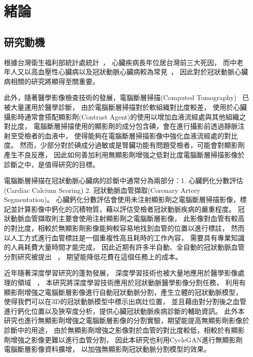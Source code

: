 \documentclass[class=NCU_thesis, crop=false]{standalone}
\begin{document}
\chapter{緒論}
\section{研究動機}
根據台灣衛生福利部統計處統計~\cite{weishengfulibutongjichuSiYinTongJi2017}，
心臟疾病長年位居台灣前三大死因，
而中老年人又以高血壓性心臟病以及冠狀動脈心臟病較為常見~\cite{weishengfulibuguominjiankangshuRenShiGuanXinBing2016}，
因此對於冠狀動脈心臟病相關的研究將顯得至關重要。

此外，隨著醫學影像檢查技術的發展，電腦斷層掃描(Computed Tomography)~\cite{nadrljanskiComputedTomographyRadiology,mckavanaghEssentialsCardiacComputerized2015}
已被大量運用於醫學診斷，
由於電腦斷層掃描對於軟組織對比度較差，
使用於心臟攝影時通常會搭配顯影劑(Contrast Agent)的使用以增加血液流經處與其他組織之對比度，
電腦斷層掃描使用的顯影劑的成分包含碘，會在進行攝影前透過靜脈注射至受檢者的血液中，
使得能夠在電腦斷層掃描影像中強化血液流經處的對比度。
然而，少部分對於碘成分過敏或是腎臟功能有問題受檢者，可能會對顯影劑產生不良反應，
因此如何善加利用無顯影劑增強之低對比度電腦斷層掃描影像於診斷之中，是值得研究的目標。

電腦斷層掃描在冠狀動脈心臟病的診斷中通常分為兩部分：1. 心臟鈣化分數評估(Cardiac Calcium Scoring) 2. 冠狀動脈血管擷取(Coronary Artery Segmentation)。
心臟鈣化分數評估會使用未注射顯影劑之電腦斷層掃描影像，標記並計算影像中鈣化的沉積物質，藉以評估受檢者冠狀動脈疾病的嚴重程度。
冠狀動脈血管擷取則主要會使用注射顯影劑之電腦斷層影像，
此影像對血管有較高的對比度，相較於無顯影劑影像能夠較容易地找到血管的位置以進行標註，
然而以人工方式進行血管標註是一個重複性高且耗時的工作內容，
需要具有專業知識的人員耗費大量時間才能完成，
因此近期有許多半自動、全自動的冠狀動脈血管分割研究被提出
~\cite{moeskopsDeepLearningMultitask2016, huangCoronaryArterySegmentation2018, chenCoronaryArterySegmentation2019}，
期望能降低花費在這個任務上的成本。

近年隨著深度學習研究的蓬勃發展，
深度學習技術也被大量地應用於醫學影像處理的領域
~\cite{moeskopsDeepLearningMultitask2016, huangCoronaryArterySegmentation2018, chenCoronaryArterySegmentation2019, leiMedicalImageSegmentation2020,litjensSurveyDeepLearning2017,minaeeImageSegmentationUsing2021}，
本研究將深度學習技術應用於冠狀動脈醫學影像分割任務，
利用有顯影劑增強之電腦斷層影像進行自動冠狀動脈分割，產生立體的冠狀動脈模型，
使得我們可以在3D的冠狀動脈模型中標示出病灶位置，
並且藉由對分割後之血管進行鈣化位置以及狹窄度分析，提供心臟冠狀動脈疾病診斷的輔助資訊。
此外本研究也進行無顯影劑增強之電腦斷層影像的分割實驗，期望能提高無顯影劑影像於診斷中的用途，
由於無顯影劑增強之影像對於血管的對比度較低，相較於有顯影劑增強之影像更難以進行血管分割，
因此本研究也利用CycleGAN進行無顯影劑電腦斷層影像資料擴增，
以加強無顯影劑冠狀動脈分割模型的效果。
\end{document}
